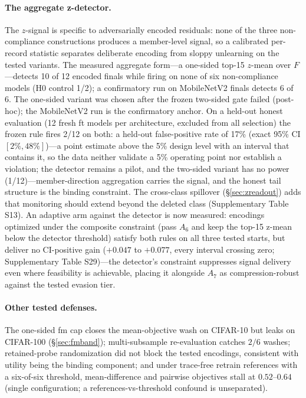 \documentclass[lettersize,journal]{IEEEtran}
\begin{document}
\paragraph*{The aggregate z-detector.}
\label{sec:audit-stat-implications}
The $z$-signal is specific to adversarially encoded residuals:
none of the three non-compliance constructions produces a
member-level signal, so a calibrated per-record statistic
separates deliberate encoding from sloppy unlearning on the
tested variants. The measured aggregate form---a one-sided
top-15 $z$-mean over $F$---detects 10 of 12 encoded finals
while firing on none of six non-compliance models (H0 control
1/2); a confirmatory run on MobileNetV2 finals detects 6 of 6. The one-sided variant was chosen after the frozen two-sided
gate failed (post-hoc); the MobileNetV2 run is the
confirmatory anchor. On a held-out honest evaluation (12
fresh ft models per architecture, excluded from all
selection) the frozen rule fires 2/12 on both: a held-out false-positive
rate of 17\% (exact 95\% CI $[2\%, 48\%]$)---a point estimate
above the 5\% design level with an interval that contains
it, so the data neither validate a 5\% operating point nor
establish a violation; the detector remains a pilot, and the
two-sided variant has no power
(1/12)---member-direction aggregation carries the signal, and
the honest tail structure is the binding constraint. The
cross-class spillover (\S\ref{sec:zreadout}) adds that
monitoring should extend beyond the deleted class
(Supplementary Table S13). An adaptive arm against the
detector is now measured: encodings optimized under the
composite constraint (pass $A_6$ and keep the top-15
z-mean below the detector threshold) satisfy both rules on
all three tested starts, but deliver no CI-positive gain
($+0.047$ to $+0.077$, every interval crossing zero;
Supplementary Table S29)---the detector's constraint
suppresses signal delivery even where feasibility is
achievable, placing it alongside $A_7$ as
compression-robust against the tested evasion tier.

\paragraph*{Other tested defenses.} The one-sided fm cap
closes the mean-objective wash on CIFAR-10 but leaks on
CIFAR-100 (\S\ref{sec:fmband}); multi-subsample re-evaluation
catches $2/6$ washes; retained-probe randomization did not
block the tested encodings, consistent with utility being
the binding component; and under trace-free retrain
references with a six-of-six threshold, mean-difference and
pairwise objectives stall at $0.52$--$0.64$ (single
configuration; a references-vs-threshold confound is
unseparated).
\end{document}

